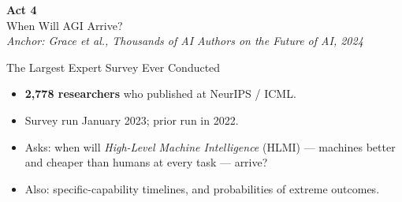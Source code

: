\documentclass[aspectratio=169, 12pt, xcolor={dvipsnames,table}]{beamer}
\newcommand{\sourcemark}[1]{\hfill{\tiny\color{gray}#1}}
\begin{document}
\begin{frame}[plain]
\begin{center}
  {\Huge\bfseries Act 4}\\[0.4em]
  {\large When Will AGI Arrive?}\\[1.5em]
  {\footnotesize\itshape Anchor: Grace et al., \emph{Thousands of AI Authors
   on the Future of AI}, 2024}
\end{center}
\end{frame}

\begin{frame}{The Largest Expert Survey Ever Conducted}
\begin{itemize}
  \item \textbf{2,778 researchers} who published at NeurIPS / ICML.
  \item Survey run January 2023; prior run in 2022.
  \item Asks: when will \emph{High-Level Machine Intelligence} (HLMI) ---
        machines better and cheaper than humans at every task --- arrive?
  \item Also: specific-capability timelines, and probabilities of
        extreme outcomes.
\end{itemize}
\sourcemark{\citealp{grace2024thousands}}
\end{frame}
\end{document}
